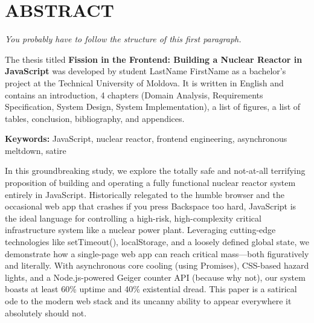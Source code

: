 \chapter*{ABSTRACT}
\thispagestyle{empty}

\textit{You probably have to follow the structure of this first paragraph.}

The thesis titled \textbf{Fission in the Frontend: Building a Nuclear Reactor in JavaScript}
was developed by student LastName FirstName as a bachelor’s project
at the Technical University of Moldova.
It is written in English and contains an introduction, 
4 chapters (Domain Analysis, Requirements Specification, System Design, System Implementation),
a list of figures, a list of tables, conclusion,
bibliography, and appendices.

\textbf{Keywords: } JavaScript, nuclear reactor, frontend engineering, asynchronous meltdown, satire

In this groundbreaking study, we explore the totally safe and not-at-all terrifying proposition of building and operating a fully functional nuclear reactor system entirely in JavaScript. Historically relegated to the humble browser and the occasional web app that crashes if you press Backspace too hard, JavaScript is the ideal language for controlling a high-risk, high-complexity critical infrastructure system like a nuclear power plant. Leveraging cutting-edge technologies like setTimeout(), localStorage, and a loosely defined global state, we demonstrate how a single-page web app can reach critical mass—both figuratively and literally. With asynchronous core cooling (using Promises), CSS-based hazard lights, and a Node.js-powered Geiger counter API (because why not), our system boasts at least 60\% uptime and 40\% existential dread. This paper is a satirical ode to the modern web stack and its uncanny ability to appear everywhere it absolutely should not.